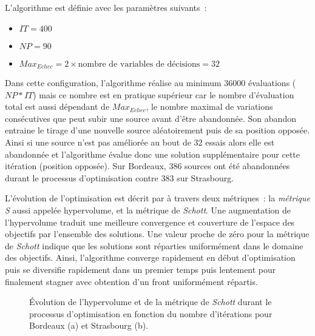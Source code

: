 L’algorithme est définie avec les paramètres suivants~:
\begin{itemize}
  \item $IT = 400$
  \item $NP = 90$
  \item $Max_{Echec} = 2 \times \text{nombre de variables de décisions} = 32$
\end{itemize}

Dans cette configuration, l’algorithme réalise au minimum \num{36000} évaluations ($NP *
IT$) mais ce nombre est en pratique supérieur car le nombre d’évaluation total est aussi
dépendant de $Max_{Echec}$, le nombre maximal de variations consécutives que peut subir
une source avant d’être abandonnée. Son abandon entraine le tirage d’une nouvelle source
aléatoirement puis de sa position opposée. Ainsi si une source n’est pas améliorée au bout
de $32$ essais alors elle est abandonnée et l’algorithme évalue donc une solution
supplémentaire pour cette itération (position opposée). Sur Bordeaux, $386$ sources ont
été abandonnées durant le processus d’optimisation contre $383$ sur Strasbourg.

L’évolution de l’optimisation est décrit par  à
travers deux métriques~: la \textit{métrique S} aussi appelée hypervolume, et la métrique
de \textit{Schott}. Une augmentation de l’hypervolume traduit une meilleure convergence et
couverture de l’espace des objectifs par l’ensemble des solutions. Une valeur proche de
zéro pour la métrique de \textit{Schott} indique que les solutions sont réparties
uniformément dans le domaine des objectifs. Ainsi, l’algorithme converge rapidement en
début d’optimisation puis se diversifie rapidement dans un premier temps puis lentement
pour finalement stagner avec obtention d’un front uniformément répartis.

\begin{figure}
    \centering
    \begin{subfigure}[b]{0.48\textwidth}
        \centering
        \caption{}
        \label{fig:hypervolume_schott_bor}
    \end{subfigure}
    \quad
    \begin{subfigure}[b]{0.48\textwidth}
        \centering
        \caption{}
        \label{fig:hypervolume_schottstras}
    \end{subfigure}
    \caption[Évolution de la convergence et de la diversification de l’optimisation]
             {Évolution de l’hypervolume et de la métrique de \textit{Schott}
              durant le processus d’optimisation en fonction du nombre d’itérations pour
              Bordeaux (a) et Strasbourg (b).}
    \label{fig:hypervolume_schott_front}
\end{figure}


